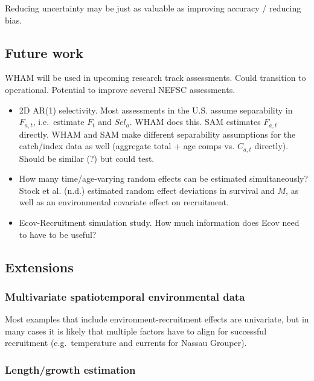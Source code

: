 \documentclass[]{article}
\providecommand{\tightlist}{%
  \setlength{\itemsep}{0pt}\setlength{\parskip}{0pt}}
\begin{document}
Reducing uncertainty may be just as valuable as improving accuracy /
reducing bias.

\hypertarget{future-work}{%
\subsection{Future work}\label{future-work}}

WHAM will be used in upcoming research track assessments. Could
transition to operational. Potential to improve several NEFSC
assessments.

\begin{itemize}
\tightlist
\item
  2D AR(1) selectivity. Most assessments in the U.S. assume separability
  in \(F_{a,t}\), i.e.~estimate \(F_t\) and \(Sel_a\). WHAM does this.
  SAM estimates \(F_{a,t}\) directly. WHAM and SAM make different
  separability assumptions for the catch/index data as well (aggregate
  total + age comps vs. \(C_{a,t}\) directly). Should be similar (?) but
  could test.
\item
  How many time/age-varying random effects can be estimated
  simultaneously? Stock et al. (n.d.) estimated random effect deviations
  in survival and \(M\), as well as an environmental covariate effect on
  recruitment.
\item
  Ecov-Recruitment simulation study. How much information does Ecov need
  to have to be useful?
\end{itemize}

\hypertarget{extensions}{%
\subsection{Extensions}\label{extensions}}

\hypertarget{multivariate-spatiotemporal-environmental-data}{%
\subsubsection{Multivariate spatiotemporal environmental
data}\label{multivariate-spatiotemporal-environmental-data}}

Most examples that include environment-recruitment effects are
univariate, but in many cases it is likely that multiple factors have to
align for successful recruitment (e.g.~temperature and currents for
Nassau Grouper).

\hypertarget{lengthgrowth-estimation}{%
\subsubsection{Length/growth estimation}\label{lengthgrowth-estimation}}
\end{document}
